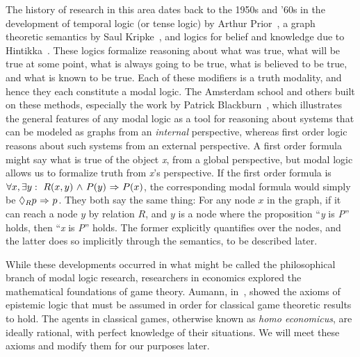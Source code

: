 The history of research in this area dates back to the 1950s and '60s in the development of temporal logic (or tense logic) by Arthur Prior~\cite{Prior}, a graph theoretic semantics by Saul Kripke~\cite{Kripke}, and logics for belief and knowledge due to Hintikka~\cite{Hintikka}. These logics formalize reasoning about what was true, what will be true at some point, what is always going to be true, what is believed to be true, and what is known to be true. Each of these modifiers is a truth modality, and hence they each constitute a modal logic. The Amsterdam school and others built on these methods, especially the work by Patrick Blackburn~\cite{modal}, which illustrates the general features of any modal logic as a tool for reasoning about systems that can be modeled as graphs from an \emph{internal} perspective, whereas first order logic reasons about such systems from an external perspective. A first order formula might say what is true of the object \emph{x}, from a global perspective, but modal logic allows us to formalize truth from \emph{x}'s perspective. If the first order formula is $\forall x, \exists y:\ R(x,y) {\ \wedge \ } P(y) {\ \Rightarrow \ } P(x)$, the corresponding modal formula would simply be $\Diamond_{R} p {\ \Rightarrow \ } p$. They both say the same thing: For any node $x$ in the graph, if it can reach a node $y$ by relation $R$, and $y$ is a node where the proposition ``\emph{y} is \emph{P}'' holds, then ``\emph{x} is \emph{P}'' holds. The former explicitly quantifies over the nodes, and the latter does so implicitly through the semantics, to be described later.

While these developments occurred in what might be called the philosophical branch of modal logic research, researchers in economics explored the mathematical foundations of game theory. Aumann, in~\cite{Aumann}, showed the axioms of epistemic logic that must be assumed in order for classical game theoretic results to hold. The agents in classical games, otherwise known as \emph{homo economicus}, are ideally rational, with perfect knowledge of their situations. We will meet these axioms and modify them for our purposes later.

